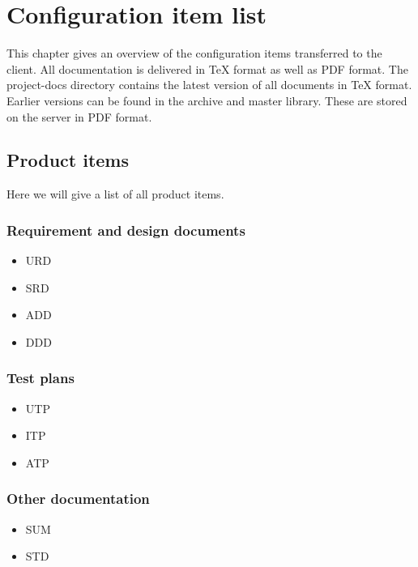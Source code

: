 \chapter{Configuration item list}
\label{chap:conf}
This chapter gives an overview of the configuration items transferred to the client. All
documentation is delivered in \TeX{} format as well as PDF format. The project-docs directory
contains the latest version of all documents in \TeX{} format. Earlier
versions can be found in the archive and master library. These are stored on the \projectname{} 
server in PDF format.

\section{Product items}
\label{sec:prodItems}

Here we will give a list of all product items.

\subsection{Requirement and design documents}
\begin{itemize}
\item URD \cite{urd}
\item SRD \cite{srd}
\item ADD \cite{add}
\item DDD \cite{ddd}
\end{itemize}

\subsection{Test plans}
\begin{itemize}
\item UTP \cite{utp}
\item ITP \cite{itp}
\item ATP \cite{atp}
\end{itemize}

\subsection{Other documentation}
\begin{itemize}
\item SUM \cite{sum}
\item STD \cite {std}
\end{itemize}

